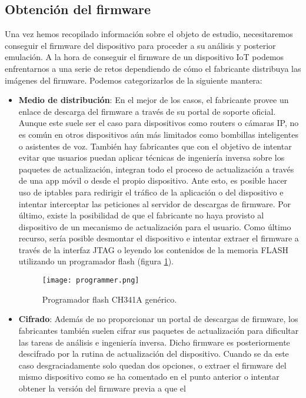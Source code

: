\subsection{Obtención del firmware}
Una vez hemos recopilado información sobre el objeto de estudio, necesitaremos conseguir el firmware del dispositivo para proceder a su análisis y posterior 
emulación. A la hora de conseguir el firmware de un dispositivo IoT podemos enfrentarnos a una serie de retos dependiendo de cómo el fabricante distribuya
las imágenes del firmware. Podemos categorizarlos de la siguiente mantera:
\begin{itemize}
    \item \textbf{Medio de distribución}: En el mejor de los casos, el fabricante provee un enlace de descarga del firmware a través de su portal de soporte oficial. Aunque
    este suele ser el caso para dispositivos como routers o cámaras IP, no es común en otros dispositivos aún más limitados como bombillas inteligentes o asistentes de voz.
    También hay fabricantes que con el objetivo de intentar evitar que usuarios puedan aplicar técnicas de ingeniería inversa sobre los paquetes de actualización, integran 
    todo el proceso de actualización a través de una app móvil o desde el propio dispositivo. Ante esto, es posible hacer uso de iptables para redirigir el tráfico
    de la aplicación o del dispositivo e intentar interceptar las peticiones al servidor de descargas de firmware. Por último, existe la posibilidad de que el fabricante no 
    haya provisto al dispositivo de un mecanismo de actualización para el usuario. Como último recurso, sería posible desmontar el dispositivo e intentar extraer el firmware 
    a través de la interfaz JTAG o leyendo los contenidos de la memoria FLASH utilizando un programador flash (figura \ref{fig:programador}).
    \begin{figure}[H]
        \centering
        \texttt{[image: programmer.png]}
        \caption{Programador flash CH341A genérico.}
        \label{fig:programador}
    \end{figure}
    \item \textbf{Cifrado}: Además de no proporcionar un portal de descargas de firmware, los fabricantes también suelen cifrar sus paquetes de actualización para dificultar las 
    tareas de análisis e ingeniería inversa. Dicho firmware es posteriormente descifrado por la rutina de actualización del dispositivo. Cuando se da este caso desgraciadamente 
    solo quedan dos opciones, o extraer el firmware del mismo dispositivo como se ha comentado en el punto anterior o intentar obtener la versión del firmware previa a que el 

\end{itemize}
